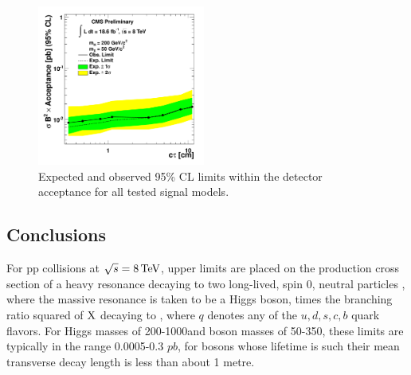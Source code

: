 \begin{figure}[htbp]
\includegraphics[width=0.49\textwidth]{plots/limits/200_50ea.pdf}

\caption{Expected and observed 95\% CL limits within the detector acceptance for all tested signal models.\label{fig:limitsacceptance}}
\end{figure}

\subsection{Conclusions}
\label{subsec:conclusions}

For pp collisions at $\sqrt{s}=8 \,\text{Te\hspace{-.08em}V}$, upper limits are placed on the production cross section
of a heavy resonance decaying to two long-lived, spin 0, neutral particles \X, where the massive resonance
is taken to be a Higgs boson, times the branching ratio squared of $\mathrm{X}$ decaying to \qq, where $q$ denotes any
of the $u,d,s,c,b$ quark flavors. For Higgs masses of 200-1000\GeVcc and \X boson masses of 50-350\GeVcc,
these limits are typically in the range 0.0005-0.3 $pb$, for \X bosons whose lifetime is such their mean 
transverse decay length is less than about 1 metre.     
